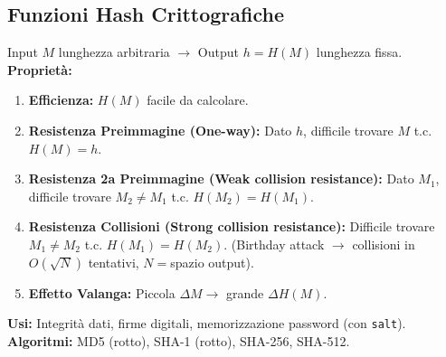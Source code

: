 \documentclass[10pt,a4paper]{article}
\begin{document}
\begin{multicols}{2}

\section*{Funzioni Hash Crittografiche}
Input $M$ lunghezza arbitraria $\rightarrow$ Output $h=H(M)$ lunghezza fissa.
\textbf{Proprietà:}
\begin{enumerate}
    \item \textbf{Efficienza:} $H(M)$ facile da calcolare.
    \item \textbf{Resistenza Preimmagine (One-way):} Dato $h$, difficile trovare $M$ t.c. $H(M)=h$.
    \item \textbf{Resistenza 2a Preimmagine (Weak collision resistance):} Dato $M_1$, difficile trovare $M_2 \neq M_1$ t.c. $H(M_2)=H(M_1)$.
    \item \textbf{Resistenza Collisioni (Strong collision resistance):} Difficile trovare $M_1 \neq M_2$ t.c. $H(M_1)=H(M_2)$.
    (Birthday attack $\rightarrow$ collisioni in $O(\sqrt{N})$ tentativi, $N=$spazio output).
    \item \textbf{Effetto Valanga:} Piccola $\Delta M \rightarrow$ grande $\Delta H(M)$.
\end{enumerate}
\textbf{Usi:} Integrità dati, firme digitali, memorizzazione password (con \texttt{salt}).
\textbf{Algoritmi:} MD5 (rotto), SHA-1 (rotto), SHA-256, SHA-512.


\end{multicols}
\end{document}
